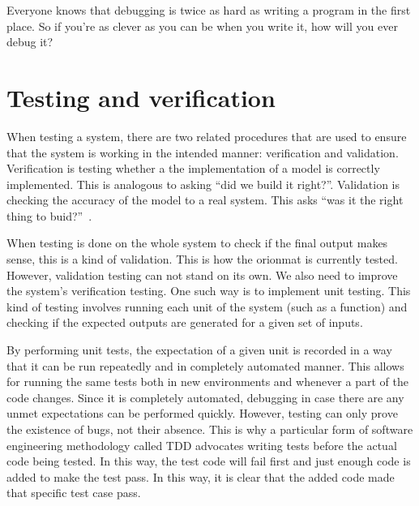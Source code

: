 

\begin{savequote}[0.55\linewidth]
	\begin{fancyquote}
		Everyone knows that debugging is twice as hard as writing a program in the
		first place. So if you're as clever as you can be when you write it, how will
		you ever debug it?
	\end{fancyquote}
\end{savequote}
\chapter{Testing and verification}\label{ch:testing}

When testing a system, there are two related procedures that are
used to ensure that the system is working in the intended manner:
verification and validation. Verification is testing whether a the
implementation of a model is correctly implemented. This is analogous to
asking  ``did we build it right?''. Validation is checking the accuracy of the model to
a real system. This asks ``was it the right thing to buid?''~\autocite{Boehm:1989}.

When testing is done on the whole system to check if the final output makes
sense, this is a kind of validation. This is how the \gls{orionmat} is
currently tested. However, validation testing can not stand on its own. We also
need to improve the system's verification testing. One such way is to implement
unit testing. This kind of testing involves running each unit of the system (such as a function)
and checking if the expected outputs are generated for a given set of inputs.

By performing unit tests, the expectation of a given unit is recorded in a way
that it can be run repeatedly and in completely automated manner. This allows
for running the same tests both in new environments and whenever a part of the
code changes. Since it is completely automated, debugging in case there are any
unmet expectations can be performed quickly. However, testing can only prove
the existence of bugs, not their absence. This is why a particular form of
software engineering methodology called \acrfull{TDD} advocates
writing tests before the actual code being tested. In this way, the test code
will fail first and just enough code is added to make the test pass. In this way,
it is clear that the added code made that specific test case pass.

